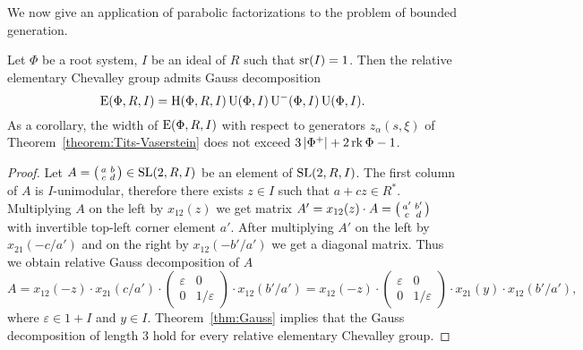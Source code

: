 We now give an application of parabolic factorizations to the problem of bounded generation.
 
\begin{lemma}\label{lemma:srRI1}
Let $\Phi$ be a root system, $I$ be an ideal of $R$ such that $\operatorname{sr}(I)=1$. Then the relative elementary Chevalley group admits Gauss decomposition
\[ \operatorname{E}(\Phi,R,I) = \operatorname{H}(\Phi,R,I) \operatorname{U}(\Phi,I)\operatorname{U}^-(\Phi,I)\operatorname{U}(\Phi,I). \]
As a corollary, the width of $\operatorname{E}(\Phi,R,I)$ with respect to generators $z_\alpha(s,\xi)$ of Theorem~\ref{theorem:Tits-Vaserstein} does not exceed $3\left|\Phi^+\right|+2\operatorname{rk}\Phi-1$.
\end{lemma}
\begin{proof}
Let $A=\begin{psmallmatrix}a & b \\ c & d\end{psmallmatrix}\in\operatorname{SL}(2,R,I)$ be an element of $\operatorname{SL}(2, R, I)$.
The first column of $A$ is $I$-unimodular, therefore there exists $z\in I$ such that $a+cz\in R^*$.
Multiplying $A$ on the left by $x_{12}(z)$ we get matrix $A'=x_{12}(z)\cdot A=\begin{psmallmatrix}a' & b' \\ c & d\end{psmallmatrix}$ with invertible top-left corner element $a'$.
After multiplying $A'$ on the left by $x_{21}(-c/a')$ and on the right by $x_{12}(-b'/a')$ we get a diagonal matrix. 
Thus we obtain relative Gauss decomposition of $A$
\begin{equation}\nonumber
A=x_{12}(-z)\cdot x_{21}(c/a')\cdot
\begin{pmatrix} \varepsilon & 0 \\ 0 & 1/\varepsilon \end{pmatrix}
\cdot x_{12}(b'/a')=x_{12}(-z)\cdot
\begin{pmatrix} \varepsilon & 0 \\ 0 & 1/\varepsilon \end{pmatrix}
\cdot x_{21}(y) \cdot x_{12}(b'/a'),
\end{equation}
where $\varepsilon\in 1+I$ and $y\in I$. Theorem~\ref{thm:Gauss} implies that the Gauss decomposition of length $3$ hold for every relative elementary Chevalley group.


\end{proof}
